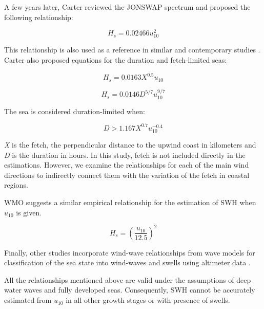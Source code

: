 A few years later, Carter \cite{Carter1982} reviewed the JONSWAP spectrum \cite{Hasselmann1973} and proposed the following relationship:

\begin{equation}
H_{s} = 0.02466 u_{10}^{2}
\label{eqn:jonswap}
\end{equation}

This relationship is also used as a reference in similar and contemporary studies \cite{Andreas2007}. Carter also proposed equations for the duration and fetch-limited seas:

\begin{equation}
H_{s} = 0.0163 X^{0.5} u_{10}
\label{eqn:fetch_limited}
\end{equation}

\begin{equation}
H_{s} = 0.0146 D^{5/7} u_{10}^{9/7}
\label{eqn:duration_limited}
\end{equation}

The sea is considered duration-limited when:

\begin{equation}
D > 1.167 X^{0.7} u_{10}^{-0.4}
\label{eqn:duration_limited_condition}
\end{equation}

\emph{X} is the fetch, the perpendicular distance to the upwind coast in kilometers and \emph{D} is the duration in hours. In this study, fetch is not included directly in the estimations. However, we examine the relationships for each of the main wind directions to indirectly connect them with the variation of the fetch in coastal regions.

WMO \cite{Organization1998a} suggests a similar empirical relationship for the estimation of SWH when $u_{10}$ is given.

\begin{equation}
H_{s} = \left(\frac{u_{10}}{12.5}\right)^{2}
\label{eqn:wmo_relationship}
\end{equation}

Finally, other studies incorporate wind-wave relationships from wave models for classification of the sea state into wind-waves and swells using altimeter data \cite{Chen2002}.

All the relationships mentioned above are valid under the assumptions of deep water waves and fully developed seas. Consequently, SWH cannot be accurately estimated from $u_{10}$ in all other growth stages or with presence of swells. 



